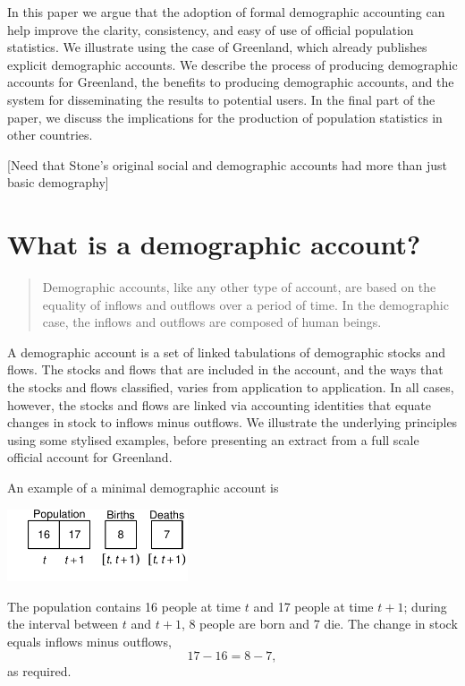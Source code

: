 \documentclass[USenglish]{article}
\begin{document}
In this paper we argue that the adoption of formal demographic accounting can help improve the clarity, consistency, and easy of use of official population statistics. We illustrate using the case of Greenland, which already publishes explicit demographic accounts. We describe the process of producing demographic accounts for Greenland, the benefits to producing demographic accounts, and the system for disseminating the results to potential users. In the final part of the paper, we discuss the implications for the production of population statistics in other countries.

[Need that Stone's original social and demographic accounts had more than just basic demography]


\section{What is a demographic account?}

\begin{quote}
Demographic accounts, like any other type of account, are based on the equality of inflows and outflows over a period of time. In the demographic case, the inflows and outflows are composed of human beings.\citep[][p. 26]{stone1984accounts}
\end{quote}

A demographic account is a set of linked tabulations of demographic stocks and flows. The stocks and flows that are included in the account, and the ways that the stocks and flows classified, varies from application to application. In all cases, however, the stocks and flows are linked via accounting identities that equate changes in stock to inflows minus outflows. We illustrate the underlying principles using some stylised examples, before presenting an extract from a full scale official account for Greenland.

An example of a minimal demographic account is
\begin{center}
\includegraphics[width=0.4\textwidth]{figures_accounts/fig_account_noage.pdf}
\end{center}
The population contains 16 people at time $t$ and 17 people at time $t+1$; during the interval between $t$ and $t+1$, 8 people are born and 7 die. The change in stock equals inflows minus outflows,
\begin{equation*}
  17 - 16 = 8 - 7,
\end{equation*}
as required.
\end{document}
